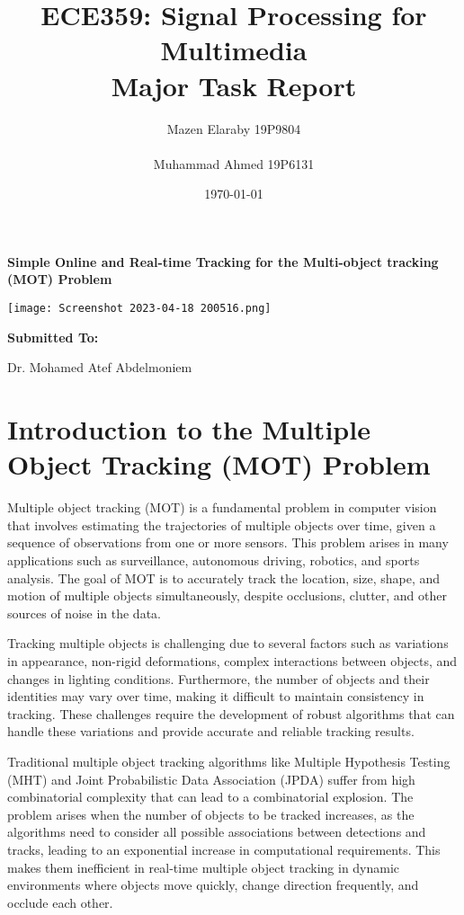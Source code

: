\documentclass[11pt]{article}
\title{\huge \textbf{ECE359: Signal Processing for Multimedia \\ Major Task Report}}
\author{\huge Mazen Elaraby 19P9804\\ \\ \huge Muhammad Ahmed 19P6131}
\date{\today}
\begin{document}
\begin{titlepage}
\maketitle

\begin{center}
\LARGE \textbf{Simple Online and Real-time Tracking for the Multi-object tracking (MOT) Problem }


\texttt{[image: Screenshot 2023-04-18 200516.png]}

\huge \textbf{Submitted To:}

Dr. Mohamed Atef Abdelmoniem
\end{center}
\end{titlepage}
\tableofcontents
\pagebreak

\section{Introduction to the Multiple Object Tracking (MOT) Problem}

Multiple object tracking (MOT) is a fundamental problem in computer vision that involves estimating the trajectories of multiple objects over time, given a sequence of observations from one or more sensors. This problem arises in many applications such as surveillance, autonomous driving, robotics, and sports analysis. The goal of MOT is to accurately track the location, size, shape, and motion of multiple objects simultaneously, despite occlusions, clutter, and other sources of noise in the data.

Tracking multiple objects is challenging due to several factors such as variations in appearance, non-rigid deformations, complex interactions between objects, and changes in lighting conditions. Furthermore, the number of objects and their identities may vary over time, making it difficult to maintain consistency in tracking. These challenges require the development of robust algorithms that can handle these variations and provide accurate and reliable tracking results.

Traditional multiple object tracking algorithms like Multiple Hypothesis Testing (MHT) and Joint Probabilistic Data Association (JPDA) suffer from high combinatorial complexity that can lead to a combinatorial explosion. The problem arises when the number of objects to be tracked increases, as the algorithms need to consider all possible associations between detections and tracks, leading to an exponential increase in computational requirements. This makes them inefficient in real-time multiple object tracking in dynamic environments where objects move quickly, change direction frequently, and occlude each other. 
\end{document}

